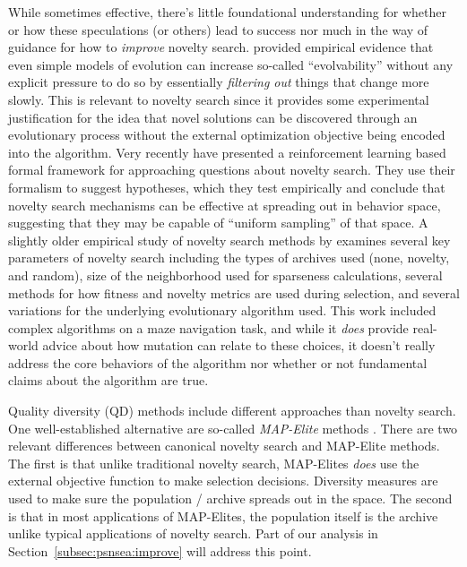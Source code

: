 \documentclass[twoside]{article}
\begin{document}
While sometimes effective, there's little foundational understanding for whether or how these speculations (or others) lead to success nor much in the way of guidance for how to \emph{improve} novelty search.  
\citet{LehmanStanley2013plosone} provided empirical evidence that even simple models of evolution can increase so-called ``evolvability'' without any explicit pressure to do so by essentially \emph{filtering out} things that change more slowly.  This is relevant to novelty search since it provides some experimental justification for the idea that novel solutions can be discovered through an evolutionary process without the external optimization objective being encoded into the algorithm.
Very recently \citet{Doncieux2020gecco,Doncieux2019gecco} have presented a reinforcement learning based formal framework for approaching questions about novelty search.  They use their formalism to suggest hypotheses, which they test empirically and conclude that novelty search mechanisms can be effective at spreading out in behavior space, suggesting that they may be capable of ``uniform sampling'' of that space.  A slightly older empirical study of novelty search methods by \citet{Gomes2015gecco} examines several key parameters of novelty search including the types of archives used (none, novelty, and random), size of the neighborhood used for sparseness calculations, several methods for how fitness and novelty metrics are used during selection, and several variations for the underlying evolutionary algorithm used.  This work included complex algorithms on a maze navigation task, and while it \emph{does} provide real-world advice about how mutation can relate to these choices, it doesn't really address the core behaviors of the algorithm nor whether or not fundamental claims about the algorithm are true.

Quality diversity (QD) methods include different approaches than novelty search.  One well-established alternative are so-called \emph{MAP-Elite} methods \citep{Choi2021gecco,Nordmoen2020corr,Flageat2020corr,MouretClune2015preprint}.  There are two relevant differences between canonical novelty search and MAP-Elite methods.  The first is that unlike traditional novelty search, MAP-Elites \emph{does} use the external objective function to make selection decisions.  Diversity measures are used to make sure the population / archive spreads out in the space.  The second is that in most applications of MAP-Elites, the population itself is the archive unlike typical applications of novelty search.  Part of our analysis in Section~\ref{subsec:psnsea:improve} will address this point.
\end{document}

